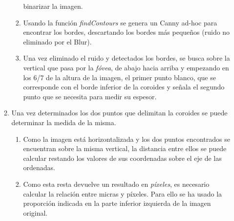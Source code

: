 \begin{enumerate}
\begin{enumerate}[label*=\arabic*.]
\begin{enumerate}[label*=\arabic*.]
      binarizar la imagen.
    \item Usando la función \emph{findContours} se genera un Canny
      ad-hoc para encontrar los bordes, descartando los bordes más
      pequeños (ruido no eliminado por el Blur).
    \item Una vez eliminado el ruido y detectados los bordes, se busca
      sobre la vertical que pasa por la \emph{fóvea}, de abajo hacia
      arriba y empezando en los 6/7 de la altura de la imagen, el
      primer punto blanco, que se corresponde con el borde inferior de
      la coroides y señala el segundo punto que se necesita para medir
      su espesor.
    \end{enumerate}
  \item Una vez determinados los dos puntos que delimitan la coroides
    se puede determinar la medida de la misma.
    \begin{enumerate}[label*=\arabic*.]
    \item Como la imagen está horizontalizada y los dos puntos
      encontrados se encuentran sobre la misma vertical, la distancia
      entre ellos se puede calcular restando los valores de sus
      coordenadas sobre el eje de las ordenadas.
    \item Como esta resta devuelve un resultado en \emph{píxeles}, es
      necesario calcular la relación entre micras y píxeles. Para ello
      se ha usado la proporción indicada en la parte inferior
      izquierda de la imagen original.
    \end{enumerate}
  \end{enumerate}
\end{enumerate}
